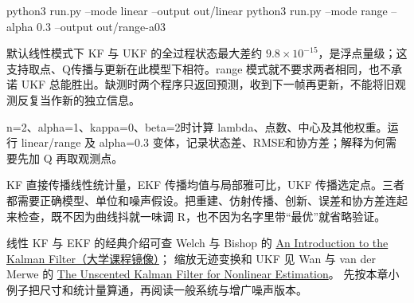\begin{example}

\begin{tbash}
python3 run.py --mode linear --output out/linear
python3 run.py --mode range --alpha 0.3 --output out/range-a03
\end{tbash}
默认线性模式下 KF 与 UKF 的全过程状态最大差约 $9.8\times10^{-15}$，是浮点量级；这支持取点、Q传播与更新在此模型下相符。range 模式就不要求两者相同，也不承诺 UKF 总能胜出。缺测时两个程序只返回预测，收到下一帧再更新，不能将旧观测反复当作新的独立信息。
\end{example}
\begin{exercise}\label{ex:v2-filter-ukf}
n=2、alpha=1、kappa=0、beta=2时计算 lambda、点数、中心及其他权重。运行 linear/range 及 alpha=0.3 变体，记录状态差、RMSE和协方差；解释为何需要先加 Q 再取观测点。
\end{exercise}
\begin{conclusion}
KF 直接传播线性统计量，EKF 传播均值与局部雅可比，UKF 传播选定点。三者都需要正确模型、单位和噪声假设。把重建、仿射传播、创新、误差和协方差连起来检查，既不因为曲线抖就一味调 R，也不因为名字里带“最优”就省略验证。
\end{conclusion}
\begin{note}
线性 KF 与 EKF 的经典介绍可查 Welch 与 Bishop 的
\href{https://www.cs.utexas.edu/~pstone/Courses/393Rfall15/readings/Welch+Bishop-TR-95.pdf}{An Introduction to the Kalman Filter（大学课程镜像）}；
缩放无迹变换和 UKF 见 Wan 与 van der Merwe 的
\href{https://groups.seas.harvard.edu/courses/cs281/papers/unscented.pdf}{The Unscented Kalman Filter for Nonlinear Estimation}。
先按本章小例子把尺寸和统计量算通，再阅读一般系统与增广噪声版本。
\end{note}
